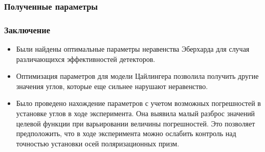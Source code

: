\documentclass[11pt,pdf,hyperref={unicode}]{beamer}
\theoremstyle{definition}
\begin{document}
\begin{frame}
\frametitle{Полученные параметры}
\begin{figure}[h]
\end{figure}
\end{frame}

\begin{frame}
\frametitle{Заключение}
\begin{itemize}
\item Были найдены оптимальные параметры неравенства Эберхарда для случая различающихся эффективностей детекторов.
\item Оптимизация параметров для модели Цайлингера позволила получить другие значения углов, которые еще сильнее нарушают неравенство.
\item Было проведено нахождение параметров с учетом возможных погрешностей в установке углов в ходе эксперимента. Она выявила малый разброс значений целевой функции при варьировании величины погрешностей. Это позволяет предположить, что в ходе эксперимента можно ослабить контроль над точностью установки осей поляризационных призм.
\end{itemize}
\end{frame}
\end{document}
